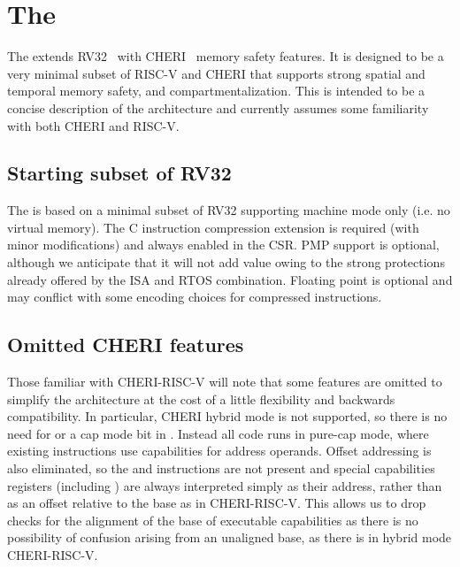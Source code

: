 \chapter{The \cherimcuisa{}}
\label{chap:cheri-riscv}


\newcommand{\riscvloadcappagefault}{0x1A}
\newcommand{\riscvstorecappagefault}{0x1B}
\newcommand{\riscvcheriexception}{0x1C}
\newcommand{\caprootX}{$\top_{X}$}
\newcommand{\caprootM}{$\top_{M}$}
\newcommand{\caprootS}{$\top_{S}$}

The \cherimcuisa{} extends RV32~\cite{RISCV:User:2.2} with CHERI~\cite{UCAM-CL-TR-951} memory safety features.
It is designed to be a very minimal subset of RISC-V and CHERI that supports strong spatial and temporal memory safety, and compartmentalization.
This is intended to be a concise description of the architecture and currently assumes some familiarity with both CHERI and RISC-V.

\section{Starting subset of RV32}

The \cherimcuisa{} is based on a minimal subset of RV32 supporting machine mode only (i.e. no virtual memory).
The C instruction compression extension is required (with minor modifications) and always enabled in the  CSR.
PMP support is optional, although we anticipate that it will not add value owing to the strong protections already offered by the \cherimcu{} ISA and RTOS combination.
Floating point is optional and may conflict with some encoding choices for compressed instructions.

\section{Omitted CHERI features}

Those familiar with CHERI-RISC-V will note that some features are omitted to simplify the architecture at the cost of a little flexibility and backwards compatibility.
In particular, CHERI hybrid mode is not supported, so there is no need for \DDC{} or a cap mode bit in \PCC{}.
Instead all code runs in pure-cap mode, where existing instructions use capabilities for address operands.
Offset addressing is also eliminated, so the  and  instructions are not present and special capabilities registers (including \PCC{}) are always interpreted simply as their address, rather than as an offset relative to the base as in CHERI-RISC-V.
This allows us to drop checks for the alignment of the base of executable capabilities as there is no possibility of confusion arising from an unaligned base, as there is in hybrid mode CHERI-RISC-V.

